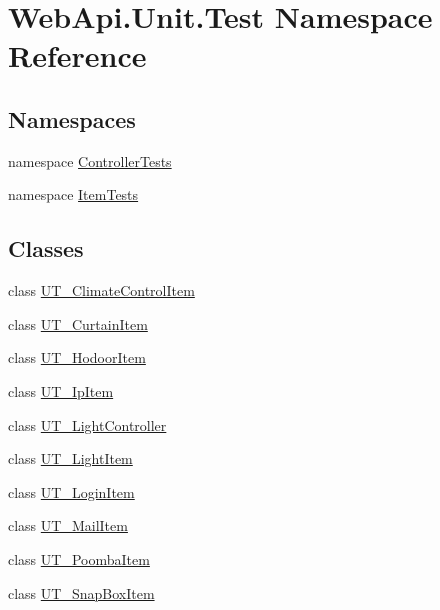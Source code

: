 \hypertarget{namespace_web_api_1_1_unit_1_1_test}{}\section{Web\+Api.\+Unit.\+Test Namespace Reference}
\label{namespace_web_api_1_1_unit_1_1_test}
\subsection*{Namespaces}
\begin{DoxyCompactItemize}
\item 
namespace \mbox{\hyperlink{namespace_web_api_1_1_unit_1_1_test_1_1_controller_tests}{Controller\+Tests}}
\item 
namespace \mbox{\hyperlink{namespace_web_api_1_1_unit_1_1_test_1_1_item_tests}{Item\+Tests}}
\end{DoxyCompactItemize}
\subsection*{Classes}
\begin{DoxyCompactItemize}
\item 
class \mbox{\hyperlink{class_web_api_1_1_unit_1_1_test_1_1_u_t___climate_control_item}{U\+T\+\_\+\+Climate\+Control\+Item}}
\item 
class \mbox{\hyperlink{class_web_api_1_1_unit_1_1_test_1_1_u_t___curtain_item}{U\+T\+\_\+\+Curtain\+Item}}
\item 
class \mbox{\hyperlink{class_web_api_1_1_unit_1_1_test_1_1_u_t___hodoor_item}{U\+T\+\_\+\+Hodoor\+Item}}
\item 
class \mbox{\hyperlink{class_web_api_1_1_unit_1_1_test_1_1_u_t___ip_item}{U\+T\+\_\+\+Ip\+Item}}
\item 
class \mbox{\hyperlink{class_web_api_1_1_unit_1_1_test_1_1_u_t___light_controller}{U\+T\+\_\+\+Light\+Controller}}
\item 
class \mbox{\hyperlink{class_web_api_1_1_unit_1_1_test_1_1_u_t___light_item}{U\+T\+\_\+\+Light\+Item}}
\item 
class \mbox{\hyperlink{class_web_api_1_1_unit_1_1_test_1_1_u_t___login_item}{U\+T\+\_\+\+Login\+Item}}
\item 
class \mbox{\hyperlink{class_web_api_1_1_unit_1_1_test_1_1_u_t___mail_item}{U\+T\+\_\+\+Mail\+Item}}
\item 
class \mbox{\hyperlink{class_web_api_1_1_unit_1_1_test_1_1_u_t___poomba_item}{U\+T\+\_\+\+Poomba\+Item}}
\item 
class \mbox{\hyperlink{class_web_api_1_1_unit_1_1_test_1_1_u_t___snap_box_item}{U\+T\+\_\+\+Snap\+Box\+Item}}
\end{DoxyCompactItemize}
